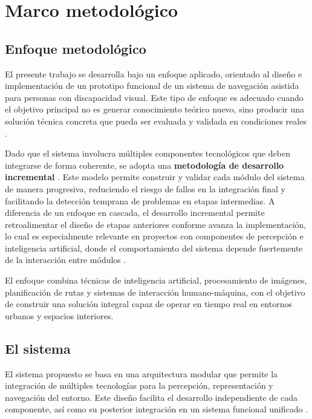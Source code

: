 \chapter{Marco metodológico}

\section{Enfoque metodológico}

El presente trabajo se desarrolla bajo un enfoque aplicado, orientado al diseño e implementación de un prototipo funcional de un sistema de navegación asistida para personas con discapacidad visual. Este tipo de enfoque es adecuado cuando el objetivo principal no es generar conocimiento teórico nuevo, sino producir una solución técnica concreta que pueda ser evaluada y validada en condiciones reales \cite{hernandez2014metodologia}.

Dado que el sistema involucra múltiples componentes tecnológicos que deben integrarse de forma coherente, se adopta una \textbf{metodología de desarrollo incremental} \cite{sommerville2011software}. Este modelo permite construir y validar cada módulo del sistema de manera progresiva, reduciendo el riesgo de fallos en la integración final y facilitando la detección temprana de problemas en etapas intermedias. A diferencia de un enfoque en cascada, el desarrollo incremental permite retroalimentar el diseño de etapas anteriores conforme avanza la implementación, lo cual es especialmente relevante en proyectos con componentes de percepción e inteligencia artificial, donde el comportamiento del sistema depende fuertemente de la interacción entre módulos \cite{pressman2014ingenieria}.

El enfoque combina técnicas de inteligencia artificial, procesamiento de imágenes, planificación de rutas y sistemas de interacción humano-máquina, con el objetivo de construir una solución integral capaz de operar en tiempo real en entornos urbanos y espacios interiores.

\section{El sistema}

El sistema propuesto se basa en una arquitectura modular que permite la integración de múltiples tecnologías para la percepción, representación y navegación del entorno. Este diseño facilita el desarrollo independiente de cada componente, así como su posterior integración en un sistema funcional unificado \cite{bass2012software}.

